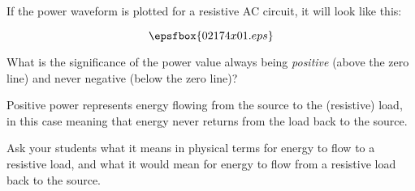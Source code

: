 

If the power waveform is plotted for a resistive AC circuit, it will look like this:

$$\epsfbox{02174x01.eps}$$

What is the significance of the power value always being {\it positive} (above the zero line) and never negative (below the zero line)?







Positive power represents energy flowing from the source to the (resistive) load, in this case meaning that energy never returns from the load back to the source.







Ask your students what it means in physical terms for energy to flow to a resistive load, and what it would mean for energy to flow from a resistive load back to the source.




